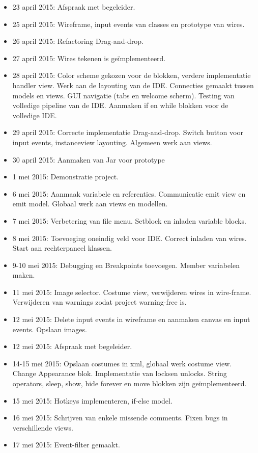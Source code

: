 \documentclass[]{article}
\begin{document}
\begin{itemize}
\item 23 april 2015: Afspraak met begeleider.
\item 25 april 2015: Wireframe, input events van classes en prototype van wires. 
\item 26 april 2015: Refactoring Drag-and-drop.
\item 27 april 2015: Wires tekenen is ge\"implementeerd.
\item 28 april 2015: Color scheme gekozen voor de blokken, verdere implementatie handler view. Werk aan de layouting van de IDE. Connecties gemaakt tussen models en views. GUI navigatie (tabs en welcome scherm). Testing van volledige pipeline van de IDE. Aanmaken if en while blokken voor de volledige IDE. 
\item  29 april 2015: Correcte implementatie Drag-and-drop. Switch button voor input events, instanceview layouting. Algemeen werk aan views. 
\item 30 april 2015: Aanmaken van Jar voor prototype
\item 1 mei 2015: Demonstratie project.
\item 6 mei 2015: Aanmaak variabele en referenties. Communicatie emit view en emit model. Globaal werk aan views en modellen. 
\item 7 mei 2015: Verbetering van file menu. Setblock en inladen variable blocks. 
\item 8 mei 2015: Toevoeging oneindig veld voor IDE. Correct inladen van wires. Start aan rechterpaneel klassen.
\item 9-10 mei 2015: Debugging en Breakpoints toevoegen. Member variabelen maken.
\item 11 mei 2015: Image selector. Costume view, verwijderen wires in wire-frame. Verwijderen van warnings zodat project warning-free is.
\item 12 mei 2015: Delete input events in wireframe en aanmaken canvas en input events. Opslaan images.
\item 12 mei 2015: Afspraak met begeleider.
\item 14-15 mei 2015: Opslaan costumes in xml, globaal werk costume view. Change Appearance blok. Implementatie van locksen unlocks. String operators, sleep, show, hide forever en move blokken zijn ge\"implementeerd. 
\item 15 mei 2015: Hotkeys implementeren, if-else model.
\item  16 mei 2015: Schrijven van enkele missende comments. Fixen bugs in verschillende views.
\item 17 mei 2015: Event-filter gemaakt.

\end{itemize}
\end{document}
